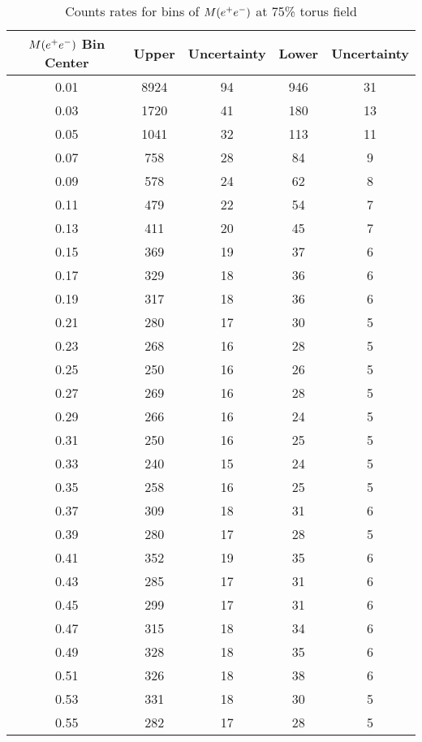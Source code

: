 \begin{table}[h!]
\begin{minipage}{\textwidth}
\begin{center}

\caption[Expected count rates]{\label{tab:counts}Counts rates for bins of $M(e^+e^-)$ at 75\% torus field\vspace{0.75mm}}

\begin{tabular}{c|c|c|c|c}

\hline
$M(e^+e^-)$ Bin Center & Upper  & Uncertainty & Lower & Uncertainty \\
\hline
0.01  & 8924  & 94  & 946  & 31\\
0.03  & 1720  & 41  & 180  & 13\\
0.05  & 1041  & 32  & 113  & 11\\
0.07  & 758  & 28  & 84  & 9\\
0.09  & 578  & 24  & 62  & 8\\
0.11  & 479  & 22  & 54  & 7\\
0.13  & 411  & 20  & 45  & 7\\
0.15  & 369  & 19  & 37  & 6\\
0.17  & 329  & 18  & 36  & 6\\
0.19  & 317  & 18  & 36  & 6\\
0.21  & 280  & 17  & 30  & 5\\
0.23  & 268  & 16  & 28  & 5\\
0.25  & 250  & 16  & 26  & 5\\
0.27  & 269  & 16  & 28  & 5\\
0.29  & 266  & 16  & 24  & 5\\
0.31  & 250  & 16  & 25  & 5\\
0.33  & 240  & 15  & 24  & 5\\
0.35  & 258  & 16  & 25  & 5\\
0.37  & 309  & 18  & 31  & 6\\
0.39  & 280  & 17  & 28  & 5\\
0.41  & 352  & 19  & 35  & 6\\
0.43  & 285  & 17  & 31  & 6\\
0.45  & 299  & 17  & 31  & 6\\
0.47  & 315  & 18  & 34  & 6\\
0.49  & 328  & 18  & 35  & 6\\
0.51  & 326  & 18  & 38  & 6\\
0.53  & 331  & 18  & 30  & 5\\
0.55  & 282  & 17  & 28  & 5\\

\end{tabular}
\end{center}
\end{minipage}
\end{table}
